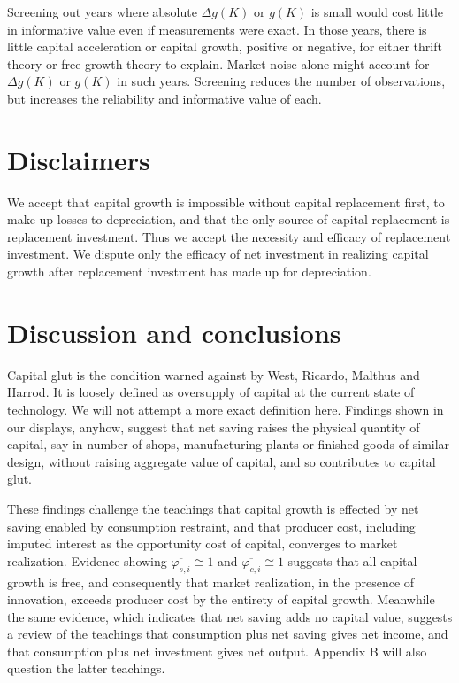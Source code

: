 Screening out years where absolute \(\Delta g(K)\) or $g(K)$ is small would cost
little in informative value even if measurements were exact. In those
years, there is little capital acceleration or capital growth, positive or negative, for
either thrift theory or free growth theory to explain. Market noise
alone might account for \(\Delta g(K)\) or $g(K)$ in such years. Screening reduces
the number of observations, but increases the reliability and
informative value of each.

\hypertarget{disclaimers}{%
\section{Disclaimers}\label{disclaimers}}

We accept that capital growth is impossible without capital replacement first, to make up losses to depreciation, and that the only source of capital replacement is replacement investment. Thus we accept the necessity and efficacy of replacement investment. We dispute only the efficacy of net investment in realizing capital growth after replacement investment has made up for depreciation.

\hypertarget{discussion-and-conclusions}{%
\section{Discussion and conclusions}\label{discussion-and-conclusions}}

Capital glut is the condition warned against by West, Ricardo, Malthus
and Harrod. It is loosely defined as oversupply of capital at the
current state of technology. We will not attempt a more exact definition
here. Findings shown in our displays, anyhow, suggest that net
saving raises the physical quantity of capital, say in number of
shops, manufacturing plants or finished goods of similar design, without
raising aggregate value of capital, and so contributes to capital glut.

These findings challenge the teachings that capital growth is effected
by net saving enabled by consumption restraint, and that producer
cost, including imputed interest as the opportunity cost of capital,
converges to market realization. Evidence showing \(\overline{\varphi_{s,i}} \cong 1\)
and \(\overline{\varphi_{c,i}} \cong 1\) suggests that all capital growth is free, and
consequently that market realization, in the presence of innovation,
exceeds producer cost by the entirety of capital growth. Meanwhile the same evidence, which indicates that net saving adds no capital value, suggests a review of the teachings that consumption plus net saving gives net income, and that consumption plus net investment gives net output. Appendix B will also question the latter teachings.

